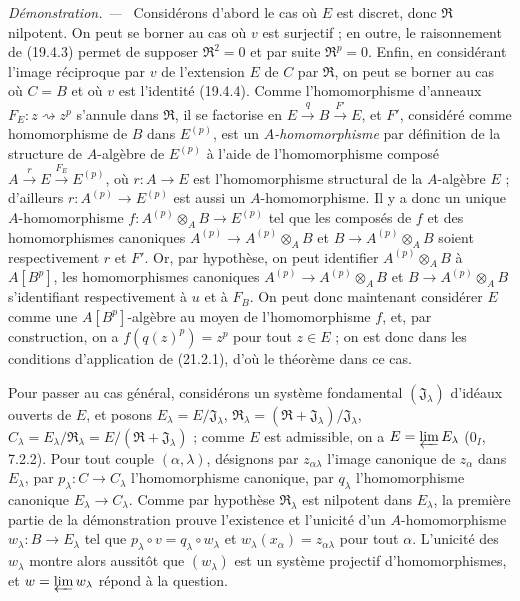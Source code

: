 \documentclass[10pt,oneside]{book}
\newcommand{\oldpage}[2][]{%
  \setcounter{footnote}{0}%
  \marginpar{\scriptsize\textbf{#1}~|~#2}\ignorespaces}
\newenvironment{proof}{%
  \par\medskip\noindent\textit{Démonstration. ---\ }}{\par}
\begin{document}
\begin{proof}
Considérons d'abord le cas où $E$ est discret, donc $\mathfrak R$ nilpotent.
On peut se borner au cas où $v$ est surjectif ; en outre, le raisonnement de
(19.4.3) permet de supposer $\mathfrak R^2=0$ et par suite $\mathfrak R^p=0$.
Enfin, en considérant l'image réciproque par $v$ de l'extension $E$ de $C$
par $\mathfrak R$, on peut se borner au cas où $C=B$ et où $v$ est l'identité
(19.4.4). Comme l'homomorphisme d'anneaux $F_E:z\rightsquigarrow z^p$
s'annule dans $\mathfrak R$, il se factorise en
$E\xrightarrow q B\xrightarrow{F'}E$,
et $F'$, considéré comme homomorphisme de $B$ dans $E^{(p)}$, est un
\emph{$A$-homomorphisme} par définition de la structure de $A$-algèbre de $E^{(p)}$
à l'aide de l'homomorphisme composé
$A\xrightarrow r E\xrightarrow{F_E}E^{(p)}$, où $r:A\to E$ est l'homomorphisme
structural de la $A$-algèbre $E$ ; d'ailleurs
$r:A^{(p)}\to E^{(p)}$ est aussi un $A$-homomorphisme. Il y a donc un unique
$A$-homomorphisme $f:A^{(p)}\otimes_A B\to E^{(p)}$ tel que les composés de $f$
et des homomorphismes canoniques $A^{(p)}\to A^{(p)}\otimes_A B$ et
$B\to A^{(p)}\otimes_A B$ soient respectivement $r$ et $F'$. Or, par hypothèse,
on peut identifier $A^{(p)}\otimes_A B$ à $A[B^p]$, les homomorphismes canoniques
$A^{(p)}\to A^{(p)}\otimes_A B$ et $B\to A^{(p)}\otimes_A B$ s'identifiant
respectivement à $u$ et à $F_B$. On peut donc maintenant considérer $E$ comme
une $A[B^p]$-algèbre au moyen de l'homomorphisme $f$, et, par construction, on a
$f(q(z)^p)=z^p$ pour tout $z\in E$ ; on est donc dans les conditions
d'application de (21.2.1), d'où le théorème dans ce cas.

Pour passer au cas général, considérons un système fondamental
$(\mathfrak J_\lambda)$ d'idéaux ouverts de $E$, et posons
$E_\lambda=E/\mathfrak J_\lambda$,
$\mathfrak R_\lambda=(\mathfrak R+\mathfrak J_\lambda)/\mathfrak J_\lambda$,
$C_\lambda=E_\lambda/\mathfrak R_\lambda=E/(\mathfrak R+\mathfrak J_\lambda)$ ;
comme $E$ est admissible, on a $E=\varprojlim E_\lambda$ (0$_I$, 7.2.2).
Pour tout couple $(\alpha,\lambda)$, désignons par $z_{\alpha\lambda}$
l'image canonique de $z_\alpha$ dans $E_\lambda$, par
$p_\lambda:C\to C_\lambda$ l'homomorphisme canonique,
\oldpage[0\textsubscript{IV-1}]{160}
par $q_\lambda$ l'homomorphisme canonique $E_\lambda\to C_\lambda$.
Comme par hypothèse $\mathfrak R_\lambda$ est nilpotent dans $E_\lambda$,
la première partie de la démonstration prouve l'existence et l'unicité d'un
$A$-homomorphisme $w_\lambda:B\to E_\lambda$ tel que
$p_\lambda\circ v=q_\lambda\circ w_\lambda$ et
$w_\lambda(x_\alpha)=z_{\alpha\lambda}$ pour tout $\alpha$.
L'unicité des $w_\lambda$ montre alors aussitôt que $(w_\lambda)$ est un
système projectif d'homomorphismes, et $w=\varprojlim w_\lambda$ répond
à la question.
\end{proof}
\end{document}
